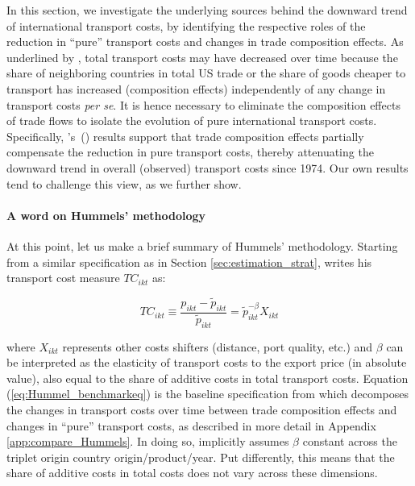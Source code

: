 \documentclass[a4paper,11pt]{article}
\newcommand\cites[1]{\citeauthor{#1}'s\ (\citeyear{#1})}
\begin{document}
In this section, we investigate the underlying sources behind the downward trend of international transport costs, by identifying the respective roles of the reduction in ``pure'' transport costs and changes in trade composition effects. As underlined by \cite{hummels2007}, total transport costs may have decreased over time because the share of neighboring countries in total US trade or the share of goods cheaper to transport has increased (composition effects) independently of any change in transport costs \textit{per se}. It is hence necessary to eliminate the composition effects of trade flows to isolate the evolution of pure international transport costs. Specifically, \cites{hummels2007} results support that trade composition effects partially compensate the reduction in pure transport costs, thereby attenuating the downward trend in overall (observed) transport costs since 1974. Our own results tend to challenge this view, as we further show.

\paragraph{A word on Hummels' methodology} At this point, let us make a brief summary of Hummels' methodology\nocite{hummels2007}.
Starting from a similar specification as in Section \ref{sec:estimation_strat}, \cite{hummels2007} writes his transport cost measure $TC_{ikt}$ as:

\begin{equation}
TC_{ikt}\equiv \frac{p_{ikt}-\widetilde{p}_{ikt}}{\widetilde{p}_{ikt}} = \widetilde{p}_{ikt}^{-\beta}X_{ikt} \label{eq:Hummel_benchmarkeq}
\end{equation}

\noindent where $X_{ikt}$ represents other costs shifters (distance, port quality, etc.) and $\beta$ can be interpreted as the elasticity of transport costs to the export price (in absolute value), also equal to the share of additive costs in total transport costs.
Equation (\ref{eq:Hummel_benchmarkeq}) is the baseline specification from which \cite{hummels2007} decomposes the changes in transport costs over time between trade composition effects and changes in ``pure'' transport costs, as described in more detail in Appendix \ref{app:compare_Hummels}.
In doing so, \cite{hummels2007} implicitly assumes $\beta$ constant across the triplet origin country origin/product/year.
Put differently, this means that the share of additive costs in total costs does not vary across these dimensions.
\end{document}
